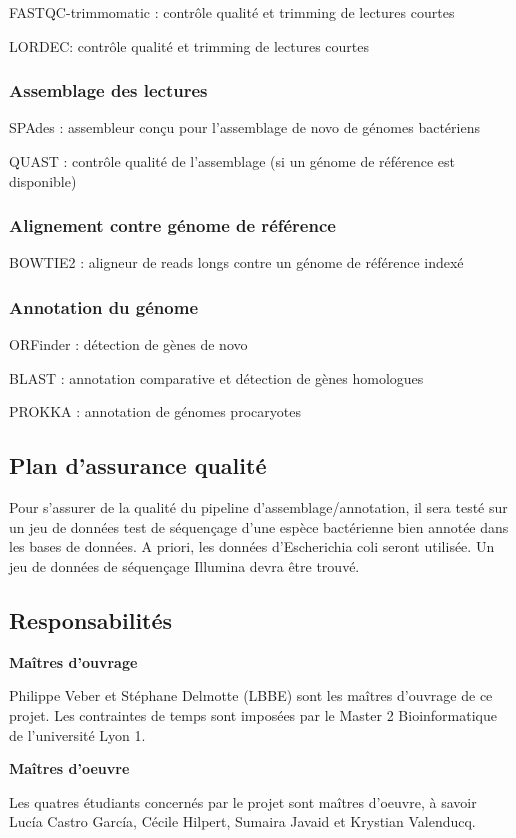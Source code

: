 \forceindent FASTQC-trimmomatic : contrôle qualité et trimming de lectures courtes

\forceindent LORDEC: contrôle qualité et trimming de lectures courtes 


\subsubsection{Assemblage des lectures}

\forceindent SPAdes \cite{spades}: assembleur conçu pour l'assemblage de novo de génomes bactériens

\forceindent QUAST \cite{gurevich2013quast} : contrôle qualité de l'assemblage (si un génome de référence est disponible)

\subsubsection{Alignement contre génome de référence}

\forceindent BOWTIE2 \cite{langmead2012fast}: aligneur de reads longs contre un génome de référence indexé

\subsubsection{Annotation du génome}

\forceindent ORFinder : détection de gènes de novo

\forceindent BLAST \cite{camacho2009blast+}: annotation comparative et détection de gènes homologues

\forceindent PROKKA : annotation de génomes procaryotes

\subsection{Plan d'assurance qualité}

Pour s’assurer de la qualité du pipeline d’assemblage/annotation, il sera testé sur un jeu de données test de séquençage d’une espèce bactérienne bien annotée dans les bases de données. A priori, les données d’Escherichia coli seront utilisée. Un jeu de données de séquençage Illumina devra être trouvé.


\subsection{Responsabilités}
\textbf{Maîtres d'ouvrage}

Philippe Veber et Stéphane Delmotte (LBBE) sont les maîtres d'ouvrage de ce projet. Les contraintes de temps sont imposées par le Master 2 Bioinformatique de l’université Lyon 1.

\textbf{Maîtres d'oeuvre}

Les quatres étudiants concernés par le projet sont maîtres d’oeuvre, à savoir Lucía Castro García, Cécile Hilpert, Sumaira Javaid et Krystian Valenducq.
